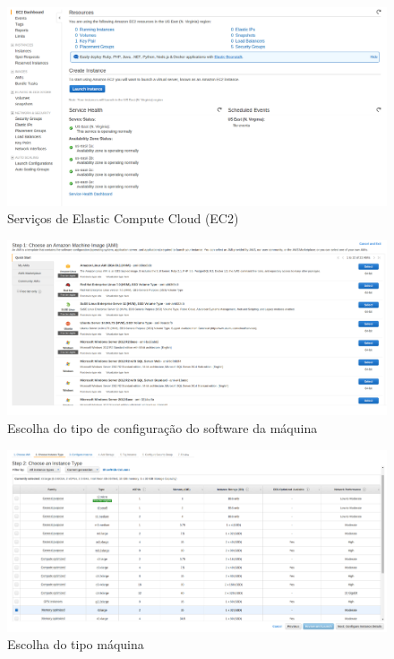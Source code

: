 \begin{figure}[htp]
    \begin{center}
    \includegraphics[width=1\textwidth]{img/aws_ec2}
    \end{center}
    \caption{Serviços de Elastic Compute Cloud (EC2)}
    \label{fig:aws_ec2}
\end{figure}

\begin{figure}[htp]
    \begin{center}
    \includegraphics[width=1\textwidth]{img/aws_setup_ec2}
    \end{center}
    \caption{Escolha do tipo de configuração do software da máquina}
    \label{fig:aws_setup_ec2}
\end{figure}

\begin{figure}[htp]
    \begin{center}
    \includegraphics[width=1\textwidth]{img/aws_setup_ec2_maquina}
    \end{center}
    \caption{Escolha do tipo máquina}
    \label{fig:aws_setup_ec2_maquina}
\end{figure}

